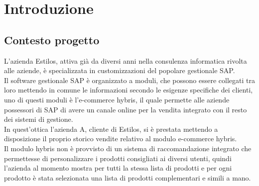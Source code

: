 
\chapter{Introduzione}
\section{Contesto progetto}
L'azienda Estilos, attiva già da diversi anni nella consulenza informatica rivolta alle aziende, è specializzata in customizzazioni del popolare gestionale SAP.\\
Il software gestionale SAP è organizzato a moduli, che possono essere collegati tra loro mettendo in comune le informazioni secondo le esigenze specifiche dei clienti, uno di questi moduli è l'e-commerce hybris, il quale permette alle aziende possessori di SAP di avere un canale online per la vendita integrato con il resto dei sistemi di gestione.\\ 
In quest'ottica l'azienda A, cliente di Estilos, si è prestata mettendo a disposizione il proprio storico vendite relativo al modulo e-commerce hybris.\\
Il modulo hybris non è provvisto di un sistema di raccomandazione integrato che permettesse di personalizzare i prodotti consigliati ai diversi utenti, quindi l'azienda al momento mostra per tutti la stessa lista di prodotti e per ogni prodotto è stata selezionata una lista di prodotti complementari e simili a mano.

